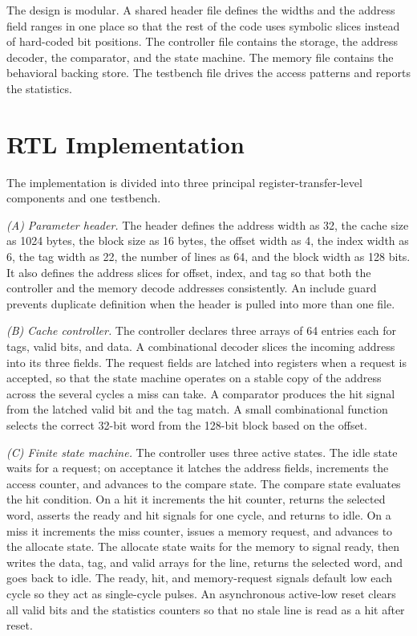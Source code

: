 \documentclass[conference]{IEEEtran}
\begin{document}
The design is modular. A shared header file defines the widths and the address field ranges in one place so that the rest of the code uses symbolic slices instead of hard-coded bit positions. The controller file contains the storage, the address decoder, the comparator, and the state machine. The memory file contains the behavioral backing store. The testbench file drives the access patterns and reports the statistics.

\section{RTL Implementation}
The implementation is divided into three principal register-transfer-level components and one testbench.

\textit{(A) Parameter header.} The header defines the address width as 32, the cache size as 1024 bytes, the block size as 16 bytes, the offset width as 4, the index width as 6, the tag width as 22, the number of lines as 64, and the block width as 128 bits. It also defines the address slices for offset, index, and tag so that both the controller and the memory decode addresses consistently. An include guard prevents duplicate definition when the header is pulled into more than one file.

\textit{(B) Cache controller.} The controller declares three arrays of 64 entries each for tags, valid bits, and data. A combinational decoder slices the incoming address into its three fields. The request fields are latched into registers when a request is accepted, so that the state machine operates on a stable copy of the address across the several cycles a miss can take. A comparator produces the hit signal from the latched valid bit and the tag match. A small combinational function selects the correct 32-bit word from the 128-bit block based on the offset.

\textit{(C) Finite state machine.} The controller uses three active states. The idle state waits for a request; on acceptance it latches the address fields, increments the access counter, and advances to the compare state. The compare state evaluates the hit condition. On a hit it increments the hit counter, returns the selected word, asserts the ready and hit signals for one cycle, and returns to idle. On a miss it increments the miss counter, issues a memory request, and advances to the allocate state. The allocate state waits for the memory to signal ready, then writes the data, tag, and valid arrays for the line, returns the selected word, and goes back to idle. The ready, hit, and memory-request signals default low each cycle so they act as single-cycle pulses. An asynchronous active-low reset clears all valid bits and the statistics counters so that no stale line is read as a hit after reset.
\end{document}
